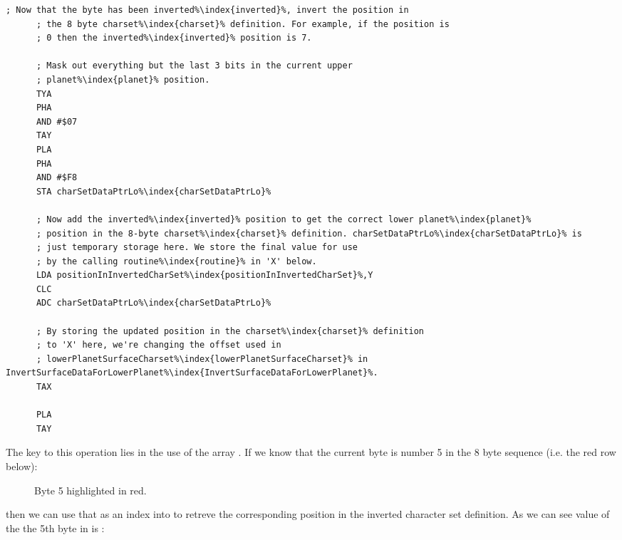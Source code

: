\begin{lstlisting}[escapechar=\%]
      ; Now that the byte has been inverted%\index{inverted}%, invert the position in
      ; the 8 byte charset%\index{charset}% definition. For example, if the position is
      ; 0 then the inverted%\index{inverted}% position is 7.

      ; Mask out everything but the last 3 bits in the current upper
      ; planet%\index{planet}% position. 
      TYA
      PHA
      AND #$07
      TAY
      PLA
      PHA
      AND #$F8
      STA charSetDataPtrLo%\index{charSetDataPtrLo}%

      ; Now add the inverted%\index{inverted}% position to get the correct lower planet%\index{planet}%
      ; position in the 8-byte charset%\index{charset}% definition. charSetDataPtrLo%\index{charSetDataPtrLo}% is
      ; just temporary storage here. We store the final value for use
      ; by the calling routine%\index{routine}% in 'X' below.
      LDA positionInInvertedCharSet%\index{positionInInvertedCharSet}%,Y
      CLC
      ADC charSetDataPtrLo%\index{charSetDataPtrLo}%

      ; By storing the updated position in the charset%\index{charset}% definition
      ; to 'X' here, we're changing the offset used in 
      ; lowerPlanetSurfaceCharset%\index{lowerPlanetSurfaceCharset}% in InvertSurfaceDataForLowerPlanet%\index{InvertSurfaceDataForLowerPlanet}%.
      TAX

      PLA
      TAY
\end{lstlisting}

The key to this operation lies in the use of the array .
If we know that the current byte is number 5 in the 8 byte sequence (i.e. the red row
below):

\begin{figure}[H]
{
  \setlength{\tabcolsep}{3.0pt}
  \setlength\cmidrulewidth{\heavyrulewidth} %
    \begin{adjustbox}{width=6cm,center}
  \begin{subfigure}{0.3\textwidth}
  
  \end{subfigure}
  \end{adjustbox}
}\caption[]{Byte 5 highlighted in red.}
\end{figure}

then we can use that as an index into 
to retreve the corresponding position in the inverted character set definition. As we can
see value of the the 5th byte in  is :

